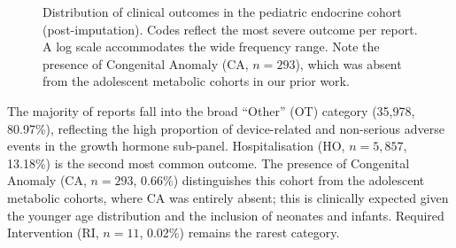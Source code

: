 \documentclass[10pt,twocolumn]{article}
\begin{document}
\begin{figure}[htbp]
\hspace{0pt}
\caption{Distribution of clinical outcomes in the pediatric endocrine cohort (post-imputation). Codes reflect the most severe outcome per report. A log scale accommodates the wide frequency range. Note the presence of Congenital Anomaly (CA, $n = 293$), which was absent from the adolescent metabolic cohorts in our prior work.}
\label{fig:outcomes}
\end{figure}
 
The majority of reports fall into the broad ``Other'' (OT) category (35{,}978, 80.97\%), reflecting the high proportion of device-related and non-serious adverse events in the growth hormone sub-panel. Hospitalisation (HO, $n = 5{,}857$, 13.18\%) is the second most common outcome. The presence of Congenital Anomaly (CA, $n = 293$, 0.66\%) distinguishes this cohort from the adolescent metabolic cohorts, where CA was entirely absent; this is clinically expected given the younger age distribution and the inclusion of neonates and infants. Required Intervention (RI, $n = 11$, 0.02\%) remains the rarest category.
 
\end{document}
